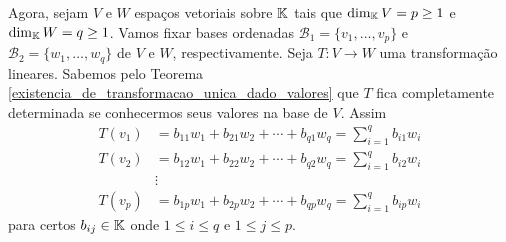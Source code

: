 Agora, sejam $V$ e $W$ espa\c{c}os vetoriais sobre $\mathbb{K}$ tais que $\dim_{\mathbb{K}}V = p \ge 1$ e $\dim_{\mathbb{K}} W = q \ge 1$. Vamos fixar bases ordenadas $\mathcal{B}_1 = \{v_1,\dots,v_p\}$ e $\mathcal{B}_2 = \{w_1,\dots,w_q\}$ de $V$ e $W$, respectivamente. Seja $T : V \to W$ uma transforma\c{c}\~ao lineares. Sabemos pelo Teorema \ref{existencia_de_transformacao_unica_dado_valores} que $T$ fica completamente determinada se conhecermos seus valores na base de $V$. Assim
\begin{align*}
	T(v_1) &= b_{11}w_1 + b_{21}w_2 + \cdots + b_{q1}w_q = \sum_{i=1}^qb_{i1}w_i\\
	T(v_2) &= b_{12}w_1 + b_{22}w_2 + \cdots + b_{q2}w_q = \sum_{i=1}^qb_{i2}w_i\\
	&\vdots\\
	T(v_p) &= b_{1p}w_1 + b_{2p}w_2 + \cdots + b_{qp}w_q = \sum_{i=1}^qb_{ip}w_i
\end{align*}
para certos $b_{ij} \in \mathbb{K}$ onde $1 \le i \le q$ e $1 \le j \le p$.

